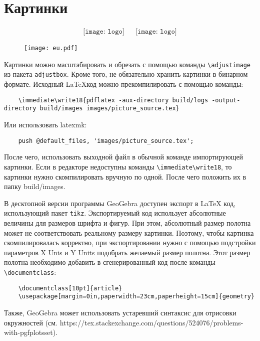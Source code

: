 \section{Картинки}

\begin{align*}
    \texttt{[image: logo]}
     &  &
    \texttt{[image: logo]}
\end{align*}
\begin{figure}[h]
    \texttt{[image: eu.pdf]}
\end{figure}
\begin{center}
\end{center}
Картинки можно масштабировать и обрезать с помощью команды \verb|\adjustimage| из пакета \verb|adjustbox|.
Кроме того, не обязательно хранить картинки в бинарном формате.
Исходный \LaTeX\:код можно прекомпилировать с помощью команды:
\begin{verbatim}
    \immediate\write18{pdflatex -aux-directory build/logs -output-directory build/images images/picture_source.tex}
\end{verbatim}
Или использовать latexmk:
\begin{verbatim}
    push @default_files, 'images/picture_source.tex';
\end{verbatim}

После чего, использовать выходной файл в обычной команде импортирующей картинки.
Если в редакторе недоступны команды \verb|\immediate\write18|, то картинки нужно скомпилировать вручную по одной.
После чего положить их в папку build/images.

В десктопной версии программы GeoGebra доступен экспорт в \LaTeX\: код, использующий пакет \verb|tikz|.
Экспортируемый код использует абсолютные величины для размеров шрифта и фигур.
При этом, абсолютный размер полотна может не соответствовать реальному размеру картинки.
Поэтому, чтобы картинка скомпилировалась корректно, при экспортировании нужно с помощью подстройки параметров X Unis и Y Units подобрать желаемый размер полотна.
Этот размер полотна необходимо добавить в сгенерированный код после команды \verb|\documentclass|:
\begin{verbatim}
    \documentclass[10pt]{article}
    \usepackage[margin=0in,paperwidth=23cm,paperheight=15cm]{geometry}
\end{verbatim}
Также, GeoGebra может использовать устаревший синтаксис для отрисовки окружностей
(см. https://tex.stackexchange.com/questions/524076/problems-with-pgfplotsset).

